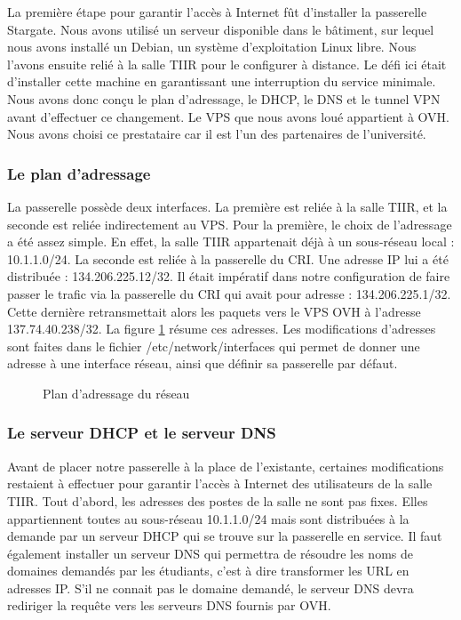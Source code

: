 La première étape pour garantir l'accès à Internet fût d'installer la passerelle Stargate. Nous avons utilisé un serveur disponible dans le bâtiment, sur lequel nous avons installé un Debian, un système d'exploitation Linux libre. Nous l'avons ensuite relié à la salle TIIR pour le configurer à distance. Le défi ici était d'installer cette machine en garantissant une interruption du service minimale. Nous avons donc conçu le plan d'adressage, le DHCP, le DNS et le tunnel VPN avant d'effectuer ce changement. Le VPS que nous avons loué appartient à OVH. Nous avons choisi ce prestataire car il est l'un des partenaires de l'université.

\subsubsection{Le plan d'adressage}

La passerelle possède deux interfaces. La première est reliée à la salle TIIR, et la seconde est reliée indirectement au VPS. Pour la première, le choix de l'adressage a été assez simple. En effet, la salle TIIR appartenait déjà à un sous-réseau local : 10.1.1.0/24. La seconde est reliée à la passerelle du CRI. Une adresse IP lui a été distribuée : 134.206.225.12/32. Il était impératif dans notre configuration de faire passer le trafic via la passerelle du CRI qui avait pour adresse : 134.206.225.1/32. Cette dernière retransmettait alors les paquets vers le VPS OVH à l'adresse 137.74.40.238/32. La figure \ref{plan_adressage} résume ces adresses. Les modifications d'adresses sont faites dans le fichier /etc/network/interfaces qui permet de donner une adresse à une interface réseau, ainsi que définir sa passerelle par défaut.

\begin{figure}[!h]
\centering
\def\svgwidth{\columnwidth}

\caption{Plan d'adressage du réseau}
\label{plan_adressage}
\end{figure}

\subsubsection{Le serveur DHCP et le serveur DNS}

Avant de placer notre passerelle à la place de l'existante, certaines modifications restaient à effectuer pour garantir l'accès à Internet des utilisateurs de la salle TIIR. Tout d'abord, les adresses des postes de la salle ne sont pas fixes. Elles appartiennent toutes au sous-réseau 10.1.1.0/24 mais sont distribuées à la demande par un serveur DHCP qui se trouve sur la passerelle en service. Il faut également installer un serveur DNS qui permettra de résoudre les noms de domaines demandés par les étudiants, c'est à dire transformer les URL en adresses IP. S'il ne connait pas le domaine demandé, le serveur DNS devra rediriger la requête vers les serveurs DNS fournis par OVH. 


